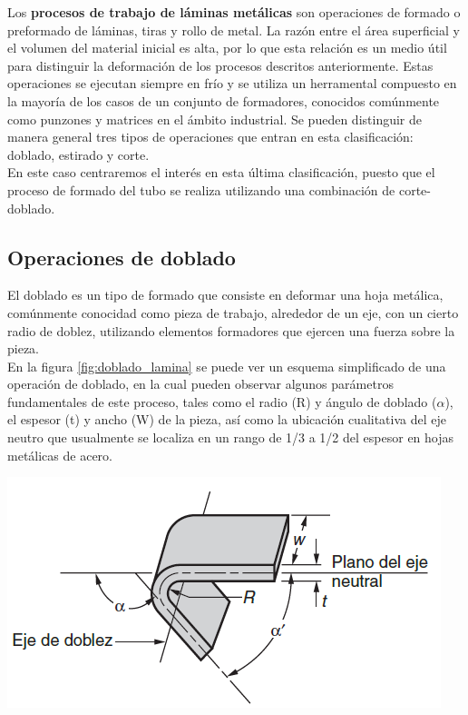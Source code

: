 Los \textbf{procesos de trabajo de láminas metálicas} son operaciones de formado o preformado 
de láminas, tiras y rollo de metal. La razón entre el área superficial y el volumen del material 
inicial es alta, por lo que esta relación es un medio útil para distinguir la deformación 
de los procesos descritos anteriormente. Estas operaciones se ejecutan siempre en frío y 
se utiliza un herramental compuesto en la mayoría de los casos de un conjunto de formadores, 
conocidos comúnmente como punzones y matrices en el ámbito industrial. Se pueden 
distinguir de manera general tres tipos de operaciones que entran en esta clasificación: 
doblado, estirado y corte.~\cite{groover2007}\\

En este caso centraremos el interés en esta última clasificación, puesto que el proceso 
de formado del tubo se realiza utilizando una combinación de corte-doblado.

\subsection{Operaciones de doblado}

El doblado es un tipo de formado que consiste en deformar una hoja metálica, 
comúnmente conocidad como pieza de trabajo, alrededor de un eje, con un cierto 
radio de doblez, utilizando elementos formadores que ejercen una fuerza 
sobre la pieza.\\

En la figura \ref{fig:doblado_lamina} se puede ver un esquema simplificado 
de una operación de doblado, en la cual pueden observar algunos parámetros 
fundamentales de este proceso, tales como el radio (R) y ángulo de doblado 
($\alpha$), el espesor (t) y ancho (W) de la pieza, así como la ubicación 
cualitativa del eje neutro que usualmente se localiza en un rango de 1/3 
a 1/2 del espesor en hojas metálicas de acero.



\begin{center}
\includegraphics[scale=0.9]{src/ch2/doblado_lamina.png}
\label{fig:doblado_lamina}
\end{center}

